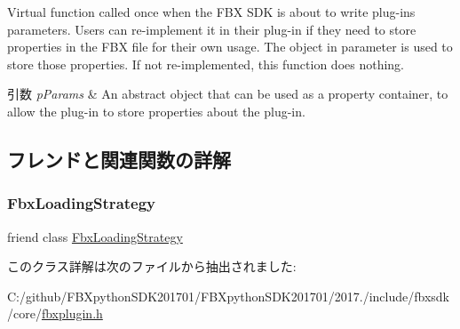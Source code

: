 Virtual function called once when the F\+BX S\+DK is about to write plug-\/in\textquotesingle{}s parameters. Users can re-\/implement it in their plug-\/in if they need to store properties in the F\+BX file for their own usage. The object in parameter is used to store those properties. If not re-\/implemented, this function does nothing. 
\begin{DoxyParams}{引数}
{\em p\+Params} & An abstract object that can be used as a property container, to allow the plug-\/in to store properties about the plug-\/in. \\
\hline
\end{DoxyParams}


\subsection{フレンドと関連関数の詳解}
\mbox{\label{class_fbx_plugin_a0e95beb1c4d5b2d326640c0ec8e9fbed}} 
\subsubsection{\texorpdfstring{Fbx\+Loading\+Strategy}{FbxLoadingStrategy}}
{\footnotesize\ttfamily friend class \hyperlink{class_fbx_loading_strategy}{Fbx\+Loading\+Strategy}\hspace{0.3cm}{\ttfamily [friend]}}



このクラス詳解は次のファイルから抽出されました\+:\begin{DoxyCompactItemize}
\item 
C\+:/github/\+F\+B\+Xpython\+S\+D\+K201701/\+F\+B\+Xpython\+S\+D\+K201701/2017./include/fbxsdk/core/\hyperlink{fbxplugin_8h}{fbxplugin.\+h}\end{DoxyCompactItemize}
